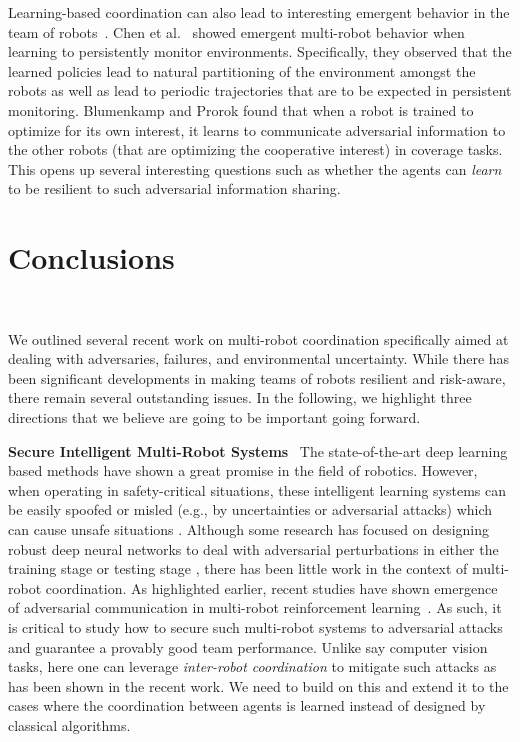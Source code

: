 Learning-based coordination can also lead to interesting emergent behavior in the team of robots~\cite{liu2019emergent,blumenkamp2020emergence,chen2020multi}. Chen et al.~\cite{chen2020multi} showed emergent multi-robot behavior when learning to persistently monitor environments. Specifically, they observed that the learned policies lead to natural partitioning of the environment amongst the robots as well as lead to periodic trajectories that are to be expected in persistent monitoring. Blumenkamp and Prorok found that when a robot is trained to optimize for its own interest, it learns to communicate adversarial information to the other robots (that are optimizing the cooperative interest) \cite{blumenkamp2020emergence} in coverage tasks. This opens up several interesting questions such as whether the agents can \emph{learn} to be resilient to such adversarial information sharing.

\section{Conclusions} ~\label{sec:future}

We outlined several recent work on multi-robot coordination specifically aimed at dealing with adversaries, failures, and environmental uncertainty. While there has been significant developments in making teams of robots resilient and risk-aware, there remain several outstanding issues. In the following, we highlight three directions that we believe are going to be important going forward. 

\noindent\textbf{Secure Intelligent Multi-Robot Systems}~ The state-of-the-art deep learning based methods have shown a great promise in the field of robotics. However, when operating in safety-critical situations, these intelligent learning systems can be easily spoofed or misled (e.g., by uncertainties or adversarial attacks) which can cause unsafe situations \cite{Kurakin2017,eykholt2018robust}. Although some research has focused on designing robust deep neural networks to deal with adversarial perturbations in either the training stage or testing stage \cite{madry2017towards,athalye2018obfuscated,tramer2017ensemble}, there has been little work in the context of multi-robot coordination. As highlighted earlier, recent studies have shown emergence of adversarial communication in multi-robot reinforcement learning~\cite{blumenkamp2020emergence}. As such, it is critical to study how to secure such multi-robot systems to adversarial attacks and guarantee a provably good team performance. Unlike say computer vision tasks, here one can leverage \textit{inter-robot coordination} to mitigate such attacks as has been shown in the recent work. We need to build on this and extend it to the cases where the coordination between agents is learned instead of designed by classical algorithms.  


